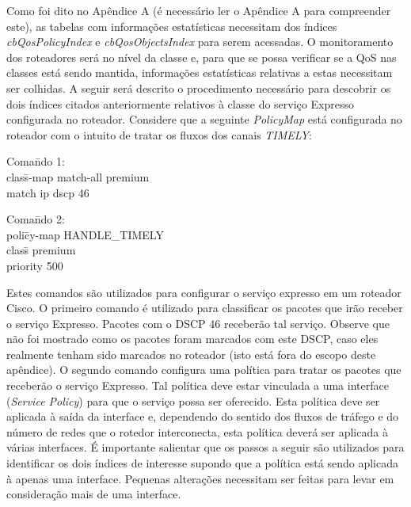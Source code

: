 \label{apend:indices_MIB}
	
	Como foi dito no Apêndice A (é necessário ler o Apêndice A para compreender este), as tabelas com informações estatísticas necessitam dos índices \textit{cbQosPolicyIndex} e \textit{cbQosObjectsIndex} para serem acessadas. O monitoramento dos roteadores será no nível da classe e, para que se possa verificar se a QoS nas classes está sendo mantida, informações estatísticas relativas a estas necessitam ser colhidas. A seguir será descrito o procedimento necessário para descobrir os dois índices citados anteriormente relativos à classe do serviço Expresso configurada no roteador. Considere que a seguinte \textit{PolicyMap} está configurada no roteador com o intuito de tratar os fluxos dos canais \textit{TIMELY}:
	
\begin{tabbing}
Coma\=ndo 1: \\
\> clas\=s-map match-all premium \\
\> \> match ip dscp 46
\end{tabbing}	

\begin{tabbing}
Coma\=ndo 2: \= \\
\> poli\=cy-map HANDLE\_TIMELY \\
\> \> clas\=s premium \\
\> \> \> priority 500
\end{tabbing}			
			
	Estes comandos são utilizados para configurar o serviço expresso em um roteador Cisco. O primeiro comando é utilizado para classificar os pacotes que irão receber o serviço Expresso. Pacotes com o DSCP 46 receberão tal serviço. Observe que não foi mostrado como os pacotes foram marcados com este DSCP, caso eles realmente tenham sido marcados no roteador (isto está fora do escopo deste apêndice). O segundo comando configura uma política para tratar os pacotes que receberão o serviço Expresso. Tal política deve estar vinculada a uma interface (\textit{Service Policy}) para que o serviço possa ser oferecido. Esta política deve ser aplicada à saída da interface e, dependendo do sentido dos fluxos de tráfego e do número de redes que o rotedor interconecta, esta política deverá ser aplicada à várias interfaces. É importante salientar que os passos a seguir são utilizados para identificar os dois índices de interesse supondo que a política está sendo aplicada à apenas uma interface. Pequenas alterações necessitam ser feitas para levar em consideração mais de uma interface.
	
